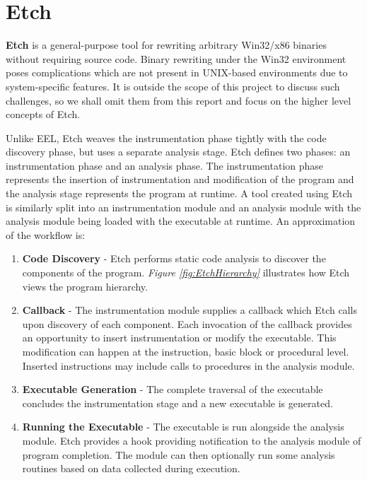 \section{Etch}

\textbf{Etch} is a general-purpose tool for rewriting arbitrary Win32/x86 binaries without requiring source code\cite{etch}. Binary rewriting under the Win32 environment poses complications which are not present in UNIX-based environments due to system-specific features. It is outside the scope of this project to discuss such challenges, so we shall omit them from this report and focus on the higher level concepts of Etch.

Unlike EEL, Etch weaves the instrumentation phase tightly with the code discovery phase, but uses a separate analysis stage. Etch defines two phases: an instrumentation phase and an analysis phase. The instrumentation phase represents the insertion of instrumentation and modification of the program and the analysis stage represents the program at runtime. A tool created using Etch is similarly split into an instrumentation module and an analysis module with the analysis module being loaded with the executable at runtime. An approximation of the workflow is:

\begin{enumerate}
 \item \textbf{Code Discovery} - Etch performs static code analysis to discover the components of the program. \emph{Figure \ref{fig:EtchHierarchy}} illustrates how Etch views the program hierarchy.
 \item \textbf{Callback} - The instrumentation module supplies a callback which Etch calls upon discovery of each component. Each invocation of the callback provides an opportunity to insert instrumentation or modify the executable. This modification can happen at the instruction, basic block or procedural level. Inserted instructions may include calls to procedures in the analysis module.
 \item \textbf{Executable Generation} - The complete traversal of the executable concludes the instrumentation stage and a new executable is generated.
 \item \textbf{Running the Executable} - The executable is run alongside the analysis module. Etch provides a hook providing notification to the analysis module of program completion. The module can then optionally run some analysis routines based on data collected during execution.
\end{enumerate}

